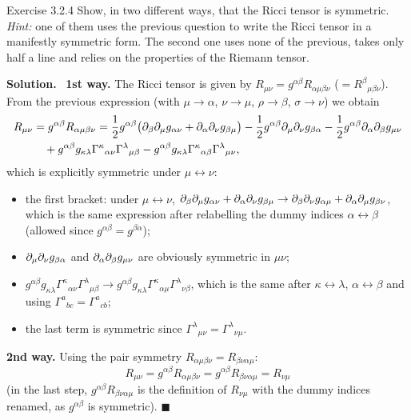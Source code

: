 \documentclass[11pt,a4paper]{article}
\numberwithin{equation}{subsection}
\newenvironment{solution}{\par\noindent\textbf{\textcolor{excol!70!black}{Solution.}}\ }{\hfill$\blacksquare$\par\medskip}
\newcommand{\added}[1]{{\color{teal!60!black}#1}}
\begin{document}
\begin{problem}{Exercise 3.2.4}
Show, in two different ways, that the Ricci tensor is symmetric. \emph{Hint:} one of them uses the previous question to write the Ricci tensor in a manifestly symmetric form. The second one uses none of the previous, takes only half a line and relies on the properties of the Riemann tensor.
\end{problem}
\begin{solution}
\textbf{1st way.} The Ricci tensor is given by $R_{\mu\nu}=g^{\alpha\beta}R_{\alpha\mu\beta\nu}$ \added{($=R^\beta{}_{\mu\beta\nu}$)}. From the previous expression (with $\mu\to\alpha$, $\nu\to\mu$, $\rho\to\beta$, $\sigma\to\nu$) we obtain
\begin{align*}
  R_{\mu\nu}&=g^{\alpha\beta}R_{\alpha\mu\beta\nu}
  =\frac12g^{\alpha\beta}\big(\partial_\beta\partial_\mu g_{\alpha\nu}+\partial_\alpha\partial_\nu g_{\beta\mu}\big)-\frac12g^{\alpha\beta}\partial_\mu\partial_\nu g_{\beta\alpha}-\frac12g^{\alpha\beta}\partial_\alpha\partial_\beta g_{\mu\nu}\\
  &\quad+g^{\alpha\beta}g_{\kappa\lambda}\Gamma^\kappa{}_{\alpha\nu}\Gamma^\lambda{}_{\mu\beta}-g^{\alpha\beta}g_{\kappa\lambda}\Gamma^\kappa{}_{\alpha\beta}\Gamma^\lambda{}_{\mu\nu},
\end{align*}
which is explicitly symmetric under $\mu\leftrightarrow\nu$:
\begin{itemize}[nosep]
\item the first bracket: under $\mu\leftrightarrow\nu$, $\partial_\beta\partial_\mu g_{\alpha\nu}+\partial_\alpha\partial_\nu g_{\beta\mu}\to\partial_\beta\partial_\nu g_{\alpha\mu}+\partial_\alpha\partial_\mu g_{\beta\nu}$, which is the same expression after relabelling the dummy indices $\alpha\leftrightarrow\beta$ (allowed since $g^{\alpha\beta}=g^{\beta\alpha}$);
\item $\partial_\mu\partial_\nu g_{\beta\alpha}$ and $\partial_\alpha\partial_\beta g_{\mu\nu}$ are obviously symmetric in $\mu\nu$;
\item $g^{\alpha\beta}g_{\kappa\lambda}\Gamma^\kappa{}_{\alpha\nu}\Gamma^\lambda{}_{\mu\beta}\to g^{\alpha\beta}g_{\kappa\lambda}\Gamma^\kappa{}_{\alpha\mu}\Gamma^\lambda{}_{\nu\beta}$, which is the same after $\kappa\leftrightarrow\lambda$, $\alpha\leftrightarrow\beta$ and using $\Gamma^a{}_{bc}=\Gamma^a{}_{cb}$;
\item the last term is symmetric since $\Gamma^\lambda{}_{\mu\nu}=\Gamma^\lambda{}_{\nu\mu}$.
\end{itemize}
\textbf{2nd way.} Using the pair symmetry $R_{\alpha\mu\beta\nu}=R_{\beta\nu\alpha\mu}$:
\[
  R_{\mu\nu}=g^{\alpha\beta}R_{\alpha\mu\beta\nu}=g^{\alpha\beta}R_{\beta\nu\alpha\mu}=R_{\nu\mu}
\]
(in the last step, $g^{\alpha\beta}R_{\beta\nu\alpha\mu}$ is the definition of $R_{\nu\mu}$ with the dummy indices renamed, as $g^{\alpha\beta}$ is symmetric).
\end{solution}
\end{document}
